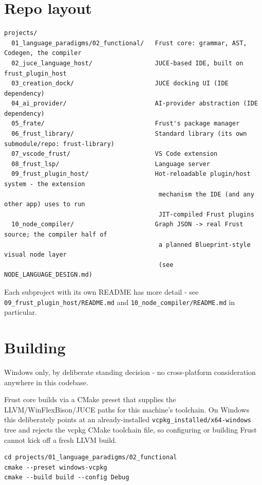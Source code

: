 \documentclass{book}
\begin{document}
\section{Repo layout}

\begin{lstlisting}
projects/
  01_language_paradigms/02_functional/   Frust core: grammar, AST, Codegen, the compiler
  02_juce_language_host/                 JUCE-based IDE, built on frust_plugin_host
  03_creation_dock/                      JUCE docking UI (IDE dependency)
  04_ai_provider/                        AI-provider abstraction (IDE dependency)
  05_frate/                              Frust's package manager
  06_frust_library/                      Standard library (its own submodule/repo: frust-library)
  07_vscode_frust/                       VS Code extension
  08_frust_lsp/                          Language server
  09_frust_plugin_host/                  Hot-reloadable plugin/host system - the extension
                                          mechanism the IDE (and any other app) uses to run
                                          JIT-compiled Frust plugins
  10_node_compiler/                      Graph JSON -> real Frust source; the compiler half of
                                          a planned Blueprint-style visual node layer
                                          (see NODE_LANGUAGE_DESIGN.md)
\end{lstlisting}

Each subproject with its own README has more detail - see
\texttt{09_frust_plugin_host/README.md}
and
\texttt{10_node_compiler/README.md}
in particular.

\section{Building}

Windows only, by deliberate standing decision - no cross-platform
consideration anywhere in this codebase.

Frust core builds via a CMake preset that supplies the LLVM/WinFlexBison/JUCE
paths for this machine's toolchain. On Windows this deliberately points at an
already-installed \texttt{vcpkg_installed/x64-windows} tree and rejects the vcpkg
CMake toolchain file, so configuring or building Frust cannot kick off a
fresh LLVM build.

\begin{lstlisting}
cd projects/01_language_paradigms/02_functional
cmake --preset windows-vcpkg
cmake --build build --config Debug
\end{lstlisting}
\end{document}
